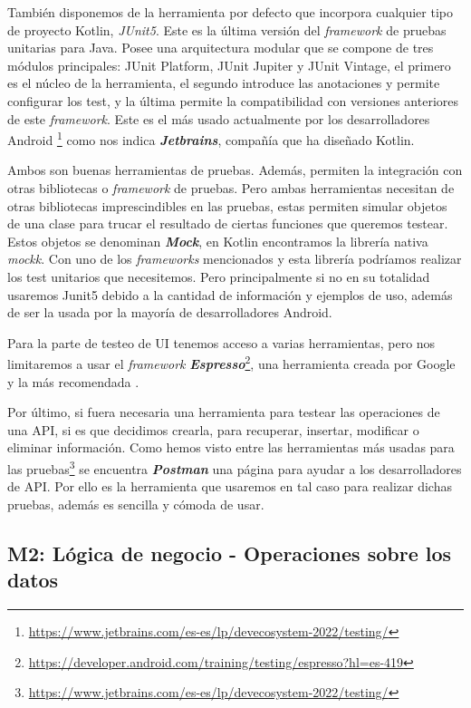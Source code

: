 También disponemos de la herramienta por defecto que incorpora cualquier tipo de proyecto Kotlin, 
\textit{JUnit5}. Este es la última versión del \textit{framework} de pruebas unitarias para Java. Posee 
una arquitectura modular que se compone de tres módulos principales: JUnit Platform, JUnit Jupiter y 
JUnit Vintage, el primero es el núcleo de la herramienta, el segundo introduce las anotaciones y 
permite configurar los test, y la última permite la compatibilidad con versiones anteriores de este 
\textit{framework}. Este es el más usado actualmente por los desarrolladores Android 
\footnote{\url{https://www.jetbrains.com/es-es/lp/devecosystem-2022/testing/}} como nos indica 
\textbf{\textit{Jetbrains}}, compañía que ha diseñado Kotlin.

Ambos son buenas herramientas de pruebas. Además, permiten la integración con otras bibliotecas o 
\textit{framework} de pruebas. Pero ambas herramientas necesitan de otras bibliotecas imprescindibles 
en las pruebas, estas permiten simular objetos de una clase para trucar el resultado de ciertas 
funciones que queremos testear. Estos objetos se denominan \textbf{\textit{Mock}}, en Kotlin 
encontramos la librería nativa \textit{mockk}. Con uno de los \textit{frameworks} 
mencionados y esta librería podríamos realizar los test unitarios que necesitemos. Pero principalmente 
si no en su totalidad usaremos Junit5 debido a la cantidad de información y ejemplos de uso, además de 
ser la usada por la mayoría de desarrolladores Android.

Para la parte de testeo de UI tenemos acceso a varias herramientas, pero nos limitaremos a usar el 
\textit{framework} \textbf{\textit{Espresso}}\footnote{\url{https://developer.android.com/training/testing/espresso?hl=es-419}}, una herramienta creada por Google y la más recomendada \cite{UITest}.

Por último, si fuera necesaria una herramienta para testear las operaciones de una API, si es que 
decidimos crearla, para  recuperar, insertar, modificar o eliminar información. Como hemos visto entre 
las herramientas más usadas para las pruebas\footnote{\url{https://www.jetbrains.com/es-es/lp/devecosystem-2022/testing/}} se encuentra \textit{\textbf{Postman}} una página para ayudar a los 
desarrolladores de API. Por ello es la herramienta que usaremos en tal caso para realizar dichas 
pruebas, además es sencilla y cómoda de usar.

\subsection{M2: Lógica de negocio - Operaciones sobre los datos}

